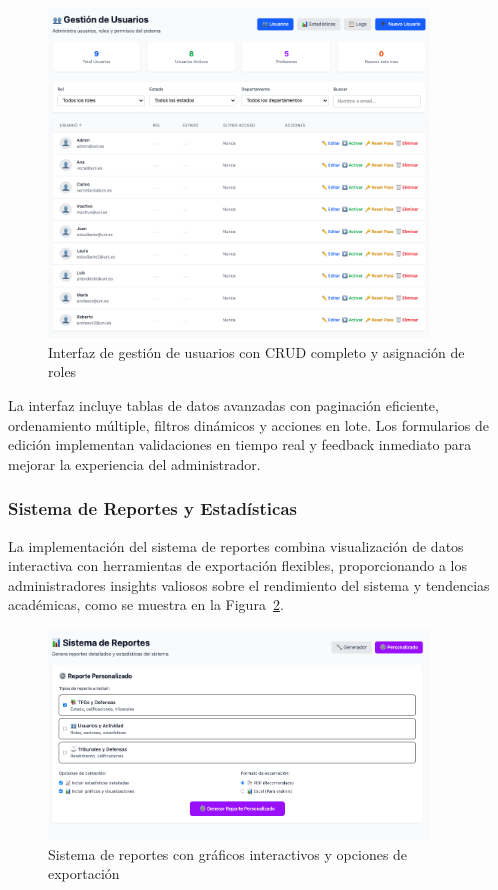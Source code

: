 \documentclass[12pt,a4paper,oneside]{report}
\begin{document}
\begin{figure}[H]
\centering
\includegraphics[width=0.9\textwidth]{processed/images/gestion_usuarios.png}
\caption{Interfaz de gestión de usuarios con CRUD completo y asignación de roles}
\label{fig:gestion-usuarios}
\end{figure}

La interfaz incluye tablas de datos avanzadas con paginación eficiente, ordenamiento múltiple, filtros dinámicos y acciones en lote. Los formularios de edición implementan validaciones en tiempo real y feedback inmediato para mejorar la experiencia del administrador.

\subsubsection{Sistema de Reportes y Estadísticas}\label{sistema-de-reportes-y-estadisticas}

La implementación del sistema de reportes combina visualización de datos interactiva con herramientas de exportación flexibles, proporcionando a los administradores insights valiosos sobre el rendimiento del sistema y tendencias académicas, como se muestra en la Figura~\ref{fig:sistema-reportes}.

\begin{figure}[H]
\centering
\includegraphics[width=0.9\textwidth]{processed/images/sistema_reportes.png}
\caption{Sistema de reportes con gráficos interactivos y opciones de exportación}
\label{fig:sistema-reportes}
\end{figure}
\end{document}
